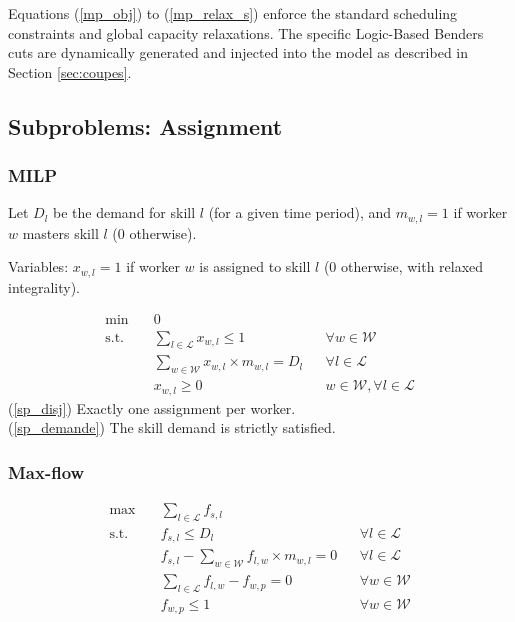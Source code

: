 \documentclass[preprint, authoryear,11pt]{elsarticle}
\begin{document}
Equations (\ref{mp_obj}) to (\ref{mp_relax_s}) enforce the standard scheduling constraints and global capacity relaxations. The specific Logic-Based Benders cuts are dynamically generated and injected into the model as described in Section \ref{sec:coupes}.


\subsection{Subproblems: Assignment}\label{ssed:2.2}

\subsubsection{MILP}
Let $D_{l}$ be the demand for skill $l$ (for a given time period), and $m_{w,l} = 1$ if worker $w$ masters skill $l$ (0 otherwise).

Variables: $x_{w,l} = 1$ if worker $w$ is assigned to skill $l$ (0 otherwise, with relaxed integrality).

\begin{align}
    \min \quad & 0 \\
    \text{s.t.} \quad & \sum_{l\in \mathcal{L}} x_{w,l} \leq 1  && \forall w \in \mathcal{W} \label{sp_disj} \\
    & \sum_{w \in \mathcal{W}} x_{w,l} \times m_{w,l} = D_{l} && \forall l \in \mathcal{L} \label{sp_demande}\\
    & x_{w,l} \geq 0 && w \in \mathcal{W}, \forall l \in \mathcal{L}  
\end{align}
(\ref{sp_disj}) Exactly one assignment per worker.\\
(\ref{sp_demande}) The skill demand is strictly satisfied.

\subsubsection{Max-flow}
\begin{align}
    \max \quad & \sum_{l \in \mathcal{L}} f_{s,l} \\
    \text{s.t.} \quad & f_{s,l}  \leq D_{l} && \forall l \in \mathcal{L} \\
    & f_{s,l} - \sum_{w \in \mathcal{W}} f_{l,w} \times m_{w,l} = 0 && \forall l \in \mathcal{L} \\
    & \sum_{l \in \mathcal{L}} f_{l,w} - f_{w,p} = 0 && \forall w \in \mathcal{W} \\
    & f_{w,p} \leq 1  && \forall w \in \mathcal{W} 
\end{align}
\end{document}
